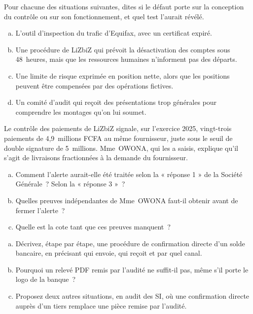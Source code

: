 \begin{boxexo}[title={\ding{45}\quad Exercice~2.4. Conception ou fonctionnement~? \niveaumoyen}]
Pour chacune des situations suivantes, dites si le défaut porte sur la
conception du contrôle ou sur son fonctionnement, et quel test l'aurait
révélé.
\begin{enumerate}[(a)]
    \item L'outil d'inspection du trafic d'Equifax, avec un certificat
          expiré.
    \item Une procédure de LiZbiZ qui prévoit la désactivation des comptes
          sous 48~heures, mais que les ressources humaines n'informent pas
          des départs.
    \item Une limite de risque exprimée en position nette, alors que les
          positions peuvent être compensées par des opérations fictives.
    \item Un comité d'audit qui reçoit des présentations trop générales
          pour comprendre les montages qu'on lui soumet.
\end{enumerate}
\end{boxexo}

\begin{boxexo}[title={\ding{45}\quad Exercice~2.5. Fermer une alerte \niveaumoyen}]
Le contrôle des paiements de LiZbiZ signale, sur l'exercice 2025,
vingt-trois paiements de 4,9~millions FCFA au même fournisseur, juste sous
le seuil de double signature de 5~millions. Mme~OWONA, qui les a saisis, explique
qu'il s'agit de livraisons fractionnées à la demande du fournisseur.
\begin{enumerate}[(a)]
    \item Comment l'alerte aurait-elle été traitée selon la « réponse 1 »
          de la Société Générale~? Selon la « réponse 3 »~?
    \item Quelles preuves indépendantes de Mme~OWONA faut-il obtenir avant
          de fermer l'alerte~?
    \item Quelle est la cote tant que ces preuves manquent~?
\end{enumerate}
\end{boxexo}

\begin{boxexo}[title={\ding{45}\quad Exercice~2.6. La confirmation directe \niveaumoyen}]
\begin{enumerate}[(a)]
    \item Décrivez, étape par étape, une procédure de confirmation directe
          d'un solde bancaire, en précisant qui envoie, qui reçoit et par
          quel canal.
    \item Pourquoi un relevé PDF remis par l'audité ne suffit-il pas, même
          s'il porte le logo de la banque~?
    \item Proposez deux autres situations, en audit des SI, où une
          confirmation directe auprès d'un tiers remplace une pièce remise
          par l'audité.
\end{enumerate}
\end{boxexo}

